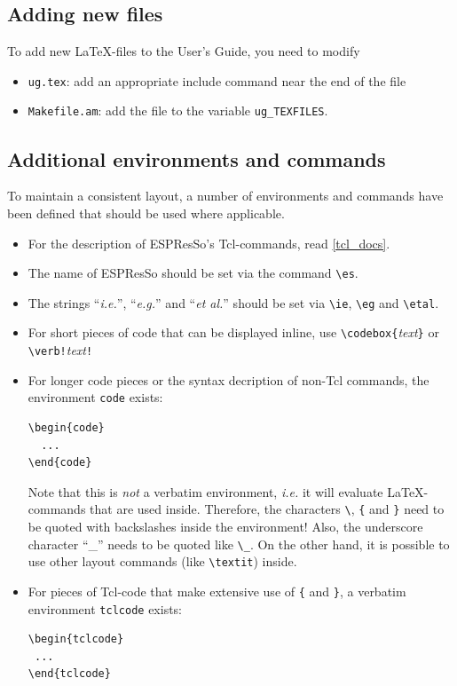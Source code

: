 \documentclass[
a4paper,                        %
11pt,                           %
twoside,                        %
footsepline,                    %
headsepline,                    %
headexclude,                    %
footexclude,                    %
pagesize,                       %
bibtotocnumbered,               %
idxtotoc                        %
]{scrartcl}
\newcommand{\es}{\mbox{\textsf{ESPResSo}}\xspace}
\newcommand{\ie}{\textit{i.e.}\xspace}
\newcommand{\eg}{\textit{e.g.}\xspace}
\newcommand{\etal}{\textit{et al.}\xspace}
\begin{document}
\subsection{Adding new files}

To add new \LaTeX-files to the User's Guide, you need to modify
\begin{itemize}
\item \texttt{ug.tex}: add an appropriate include command near the end
  of the file
\item \texttt{Makefile.am}: add the file to the variable
  \texttt{ug\_TEXFILES}. 
\end{itemize}

\subsection{Additional environments and commands}

To maintain a consistent layout, a number of environments and
commands have been defined that should be used where applicable. 
\begin{itemize}
\item For the description of \es's Tcl-commands, read \ref{tcl_docs}.
\item The name of \es should be set via the command \verb!\es!.
\item The strings ``\ie'', ``\eg'' and ``\etal'' should be set via
  \verb!\ie!, \verb!\eg! and \verb!\etal!.
\item For short pieces of code that can be displayed inline, use
  \verb!\codebox{!\textit{text}\verb!}! or \verb|\verb!|\textit{text}\verb|!|
\item For longer code pieces or the syntax decription of non-Tcl
  commands, the environment \texttt{code} exists:
\begin{verbatim}
\begin{code}
  ...
\end{code}
\end{verbatim}
  Note that this is \emph{not} a verbatim environment, \ie it will
  evaluate \LaTeX-commands that are used inside. Therefore, the
  characters \verb!\!, \verb!{! and \verb!}! need to be quoted with
  backslashes inside the environment!  Also, the underscore character
  ``\_'' needs to be quoted like \verb!\_!. On the other hand, it is
  possible to use other layout commands (like \verb!\textit!) inside.
\item For pieces of Tcl-code that make extensive use of \verb!{! and
    \verb!}!, a verbatim environment \verb!tclcode! exists: 
\begin{verbatim}
\begin{tclcode}
 ...
\end{tclcode}
\end{verbatim}
\end{itemize}
\end{document}
